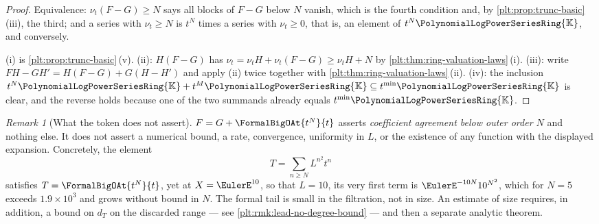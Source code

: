 \documentclass[11pt,oneside]{article}
\theoremstyle{plain}
\theoremstyle{definition}
\theoremstyle{remark}
\newtheorem{remark}[theorem]{Remark}
\newcommand{\K}{\mathbb{K}}
\newcommand{\PLpow}{\PolynomialLogPowerSeriesRing{\K}}   %
\newcommand{\ordt}{\nu_{t}}                              %
\newcommand{\dprofile}[1]{d_{#1}}                        %
\begin{document}
\begin{proof}
Equivalence: \(\ordt(F-G)\ge N\) says all blocks of \(F-G\) below \(N\)
vanish, which is the fourth condition and, by
\cref{plt:prop:trunc-basic}\,(iii), the third; and a series with
\(\ordt\ge N\) is \(t^N\) times a series with \(\ordt\ge0\), that is, an
element of \(t^N\PLpow\), and conversely.

(i) is \cref{plt:prop:trunc-basic}\,(v).  (ii): \(H(F-G)\) has
\(\ordt=\ordt H+\ordt(F-G)\ge\ordt H+N\) by
\cref{plt:thm:ring-valuation-laws}\,(i).  (iii): write
\(FH-GH'=H(F-G)+G(H-H')\) and apply (ii) twice together with
\cref{plt:thm:ring-valuation-laws}\,(ii).  (iv): the inclusion
\(t^N\PLpow+t^M\PLpow\subseteq t^{\min}\PLpow\) is clear, and the reverse
holds because one of the two summands already equals \(t^{\min}\PLpow\).
\end{proof}

\begin{remark}[What the token does not assert]
\label{plt:rmk:trunc-no-size}
\(F=G+\FormalBigOAt{t^N}{t}\) asserts \emph{coefficient agreement below outer
order \(N\)} and nothing else.  It does not assert a numerical bound, a rate,
convergence, uniformity in \(L\), or the existence of any function with the
displayed expansion.  Concretely, the element
\[
  T=\sum_{n\ge N}L^{n^2}t^n
\]
satisfies \(T=\FormalBigOAt{t^N}{t}\), yet at \(X=\EulerE^{10}\), so that
\(L=10\), its very first term is
\(\EulerE^{-10N}10^{N^2}\), which for \(N=5\) exceeds \(1.9\times10^{3}\) and
grows without bound in \(N\).  The formal tail is small in the filtration, not
in size.  An estimate of size requires, in addition, a bound on
\(\dprofile{T}\) on the discarded range --- see
\cref{plt:rmk:lead-no-degree-bound} --- and then a separate analytic theorem.
\end{remark}
\end{document}
